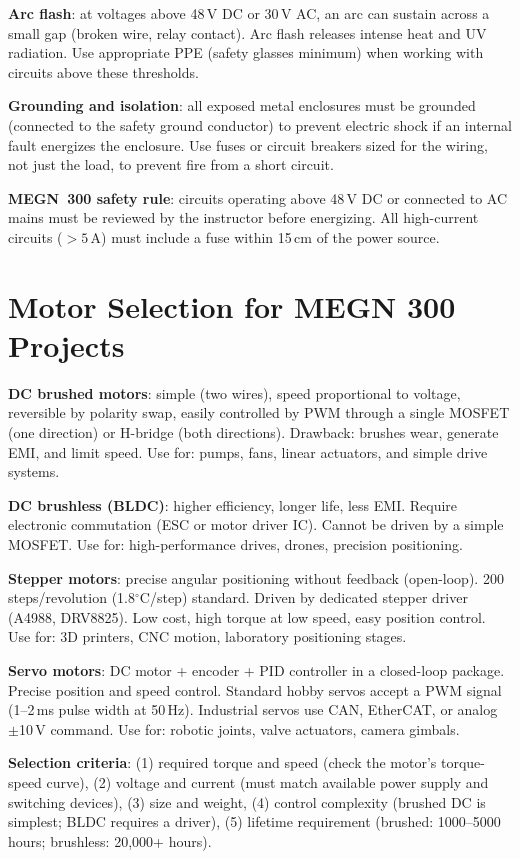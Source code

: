 \documentclass[11pt,letterpaper,twoside,openany]{book}
\newcommand{\degC}{\ensuremath{{}^{\circ}\text{C}}}
\begin{document}
\textbf{Arc flash}: at voltages above 48\,V DC or 30\,V AC, an arc can sustain across a small gap (broken wire, relay contact). Arc flash releases intense heat and UV radiation. Use appropriate PPE (safety glasses minimum) when working with circuits above these thresholds.

\textbf{Grounding and isolation}: all exposed metal enclosures must be grounded (connected to the safety ground conductor) to prevent electric shock if an internal fault energizes the enclosure. Use fuses or circuit breakers sized for the wiring, not just the load, to prevent fire from a short circuit.

\textbf{MEGN~300 safety rule}: circuits operating above 48\,V DC or connected to AC mains must be reviewed by the instructor before energizing. All high-current circuits ($> 5$\,A) must include a fuse within 15\,cm of the power source.
\section{Motor Selection for MEGN 300 Projects}
\textbf{DC brushed motors}: simple (two wires), speed proportional to voltage, reversible by polarity swap, easily controlled by PWM through a single MOSFET (one direction) or H-bridge (both directions). Drawback: brushes wear, generate EMI, and limit speed. Use for: pumps, fans, linear actuators, and simple drive systems.

\textbf{DC brushless (BLDC)}: higher efficiency, longer life, less EMI. Require electronic commutation (ESC or motor driver IC). Cannot be driven by a simple MOSFET. Use for: high-performance drives, drones, precision positioning.

\textbf{Stepper motors}: precise angular positioning without feedback (open-loop). 200 steps/revolution (1.8\degC{}/step) standard. Driven by dedicated stepper driver (A4988, DRV8825). Low cost, high torque at low speed, easy position control. Use for: 3D printers, CNC motion, laboratory positioning stages.

\textbf{Servo motors}: DC motor + encoder + PID controller in a closed-loop package. Precise position and speed control. Standard hobby servos accept a PWM signal (1--2\,ms pulse width at 50\,Hz). Industrial servos use CAN, EtherCAT, or analog $\pm$10\,V command. Use for: robotic joints, valve actuators, camera gimbals.

\textbf{Selection criteria}: (1) required torque and speed (check the motor's torque-speed curve), (2) voltage and current (must match available power supply and switching devices), (3) size and weight, (4) control complexity (brushed DC is simplest; BLDC requires a driver), (5) lifetime requirement (brushed: 1000--5000 hours; brushless: 20{,}000+ hours).
\end{document}
